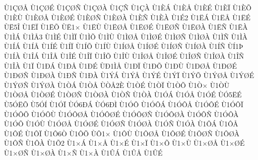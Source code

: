 {^^d91^^c7^^d8^^c5
^^d91^^c7^^d8^^c9
^^d91^^c7^^d8^^d1
^^d91^^c7^^d8^^c0
^^d91^^c7^^d1
^^d91^^c7^^c0
^^d91^^c8^^c1
^^d91^^c8^^c5
^^d91^^c8^^c9
^^d91^^c8^^cf
^^d91^^c8^^d5
^^d91^^c8^^d9
^^d91^^c8^^d8^^c5
^^d91^^c8^^d8^^c9
^^d91^^c8^^d8^^d1
^^d91^^c8^^d8^^c0
^^d91^^c8^^d1
^^d91^^c8^^c0
^^d91^^c92
^^d91^^cb^^c1
^^d91^^cb^^c5
^^d91^^cb^^c9
^^d9^^cb5^^ce
^^d91^^cb^^cf
^^d91^^cb^^d5
^^d9^^cb1^^d7
^^d91^^cb^^d9
^^d91^^cb^^d8^^c5
^^d91^^cb^^d8^^c9
^^d91^^cb^^d8^^d1
^^d91^^cb^^d8^^c0
^^d91^^cb^^d1
^^d91^^cb^^c0
^^d91^^cc^^c1
^^d91^^cc^^c53
^^d91^^cc^^c9
^^d91^^cc^^cf
^^d91^^cc^^d5
^^d91^^cc^^d9
^^d91^^cc^^d8^^c5
^^d91^^cc^^d8^^c9
^^d91^^cc^^d8^^d1
^^d91^^cc^^d8^^c0
^^d91^^cc^^d1
^^d91^^cc^^c0
^^d91^^cd^^c1
^^d91^^cd^^c5
^^d91^^cd^^c9
^^d91^^cd^^cf
^^d91^^cd^^d5
^^d91^^cd^^d9
^^d91^^cd^^d8^^c5
^^d91^^cd^^d8^^c9
^^d91^^cd^^d8^^d1
^^d91^^cd^^d8^^c0
^^d91^^cd^^d1
^^d9^^cd1^^de
^^d91^^cd^^c0
^^d91^^ce^^c1
^^d91^^ce^^c5
^^d91^^ce^^c9
^^d91^^ce^^cf
^^d91^^ce^^d5
^^d91^^ce^^d9
^^d91^^ce^^d8^^c5
^^d91^^ce^^d8^^c9
^^d91^^ce^^d8^^d1
^^d91^^ce^^d8^^c0
^^d91^^ce^^d1
^^d91^^ce^^c0
^^d91^^cf
^^d91^^d0^^c1
^^d91^^d0^^c5
^^d91^^d0^^c9
^^d9^^d01^^cc^^c5
^^d91^^d0^^cf
^^d91^^d0^^d5
^^d91^^d0^^d9
^^d91^^d0^^d8^^c5
^^d91^^d0^^d8^^c9
^^d91^^d0^^d8^^d1
^^d91^^d0^^d8^^c0
^^d91^^d0^^d1
^^d91^^d0^^c0
^^d91^^dd^^c1
^^d91^^dd^^c5
^^d91^^dd^^c9
^^d91^^dd^^cf
^^d91^^dd^^d5
^^d91^^dd^^d8^^c5
^^d91^^dd^^d8^^c9
^^d91^^dd^^d8^^d1
^^d91^^dd^^d8^^c0
^^d91^^d2^^c1
^^d91^^d2^^c5
^^d9^^d2^^c52^^c8
^^d91^^d2^^c9
^^d91^^d2^^cf
^^d91^^d2^^d5
^^d91^^d2^^d7
^^d91^^d2^^d9
^^d91^^d2^^d8^^c5
^^d91^^d2^^d8^^c9
^^d91^^d2^^d8^^d1
^^d91^^d2^^d8^^c0
^^d91^^d2^^d1
^^d91^^d2^^c0
^^d91^^d3^^c1
^^d91^^d3^^c5
^^d91^^d3^^c9
^^d9^^d35^^cb^^c9
^^d95^^d3^^cb^^d5
^^d95^^d3^^cd
^^d91^^d3^^cf
^^d9^^d36^^d0^^c1
^^d9^^d36^^d0^^cc
^^d91^^d3^^d4
^^d91^^d3^^d4^^c1
^^d91^^d3^^d4^^c5
^^d91^^d3^^d4^^c9
^^d91^^d3^^d4^^cf
^^d91^^d3^^d4^^d5
^^d91^^d3^^d4^^d9
^^d91^^d3^^d4^^d8^^c5
^^d91^^d3^^d4^^d8^^c9
^^d91^^d3^^d4^^d8^^d1
^^d91^^d3^^d4^^d8^^c0
^^d91^^d3^^d4^^d1
^^d91^^d3^^d4^^c0
^^d91^^d3^^d5
^^d91^^d3^^d9
^^d91^^d3^^d8^^c5
^^d91^^d3^^d8^^c9
^^d91^^d3^^d8^^d1
^^d91^^d3^^d8^^c0
^^d91^^d3^^d1
^^d91^^d3^^c0
^^d91^^d4^^c1
^^d91^^d4^^c5
^^d91^^d4^^c9
^^d91^^d4^^cf
^^d91^^d46^^d2
^^d91^^d4^^d5
^^d9^^d41^^d7
^^d91^^d4^^d9
^^d91^^d4^^d8^^c5
^^d91^^d4^^d8^^c9
^^d91^^d4^^d8^^d1
^^d91^^d4^^d8^^c0
^^d91^^d4^^d1
^^d91^^d4^^c0
^^d91^^d52
^^d91^^d7^^c1
^^d91^^d7^^c5
^^d91^^d7^^c9
^^d91^^d7^^cf
^^d91^^d7^^d5
^^d91^^d7^^d9
^^d91^^d7^^d8^^c5
^^d91^^d7^^d8^^c9
^^d91^^d7^^d8^^d1
^^d91^^d7^^d8^^c0
^^d91^^d7^^d1
^^d91^^d7^^c0
^^d91^^db^^c1
^^d91^^db^^c5
^^d91^^db^^c9
}
